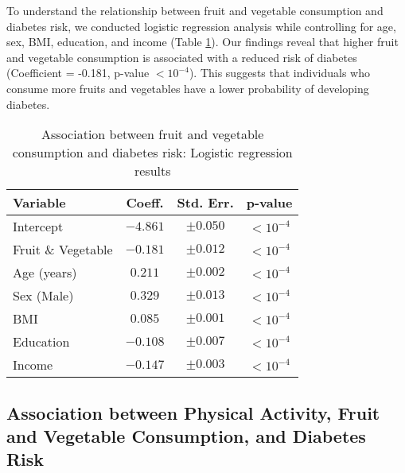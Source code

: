 \documentclass[11pt]{article}
\begin{document}
To understand the relationship between fruit and vegetable consumption and diabetes risk, we conducted logistic regression analysis while controlling for age, sex, BMI, education, and income (Table \ref{table2}). Our findings reveal that higher fruit and vegetable consumption is associated with a reduced risk of diabetes (Coefficient = -0.181, p-value $<10^{-4}$). This suggests that individuals who consume more fruits and vegetables have a lower probability of developing diabetes.\begin{table}[!htbp]
\centering
\caption{Association between fruit and vegetable consumption and diabetes risk: Logistic regression results}
\label{table2}
\begin{tabular}{l c c c}
\toprule
\textbf{Variable}  & \textbf{Coeff.} & \textbf{Std. Err.} & \textbf{p-value} \\
\midrule
Intercept          & $-4.861$        & $\pm 0.050$        & $<10^{-4}$    \\
Fruit \& Vegetable & $-0.181$        & $\pm 0.012$        & $<10^{-4}$    \\
Age (years)        & $0.211$         & $\pm 0.002$        & $<10^{-4}$    \\
Sex (Male)         & $0.329$         & $\pm 0.013$        & $<10^{-4}$    \\
BMI                & $0.085$         & $\pm 0.001$        & $<10^{-4}$    \\
Education          & $-0.108$        & $\pm 0.007$        & $<10^{-4}$    \\
Income             & $-0.147$        & $\pm 0.003$        & $<10^{-4}$    \\
\bottomrule
\end{tabular}
\end{table}

\subsection*{Association between Physical Activity, Fruit and Vegetable Consumption, and Diabetes Risk}
\end{document}

